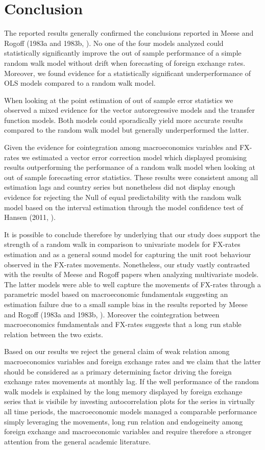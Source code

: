 \section{Conclusion}
\label{sec:conclusion}

The reported results generally confirmed the conclusions reported in Meese and Rogoff (1983a and 1983b, \cite{MeeseRogoffa, MeeseRogoffb}).
No one of the four models analyzed could statistically significantly improve the out of sample performance of a simple random walk 
model without drift when forecasting of foreign exchange rates. Moreover, we found evidence for a statistically significant underperformance of
OLS models compared to a random walk model.  

When looking at the point estimation of out of sample error statistics we observed a mixed evidence for the vector autoregressive models and the
transfer function models. Both models could sporadically yield more accurate results compared to the random walk model but generally underperformed
the latter.

Given the evidence for cointegration among macroeconomics variables and FX-rates we estimated a vector error correction model which displayed promising
results outperforming the performance of a random walk model when looking at out of sample forecasting error statistics. These results were consistent
among all estimation lags and country series but nonetheless did not display enough evidence for rejecting the Null of equal predictability with the
random walk model based on the interval estimation through the model confidence test of Hansen (2011, \cite{HansenMCS}).

It is possible to conclude therefore by underlying that our study does support the strength of a random walk in comparison to univariate models
for FX-rates estimation and as a general sound model for capturing the unit root behaviour observed in the FX-rates movements. Nonetheless, our study
vastly contrasted with the results of Meese and Rogoff papers when analyzing multivariate models. The latter models were able to well capture the
movements of FX-rates through a parametric model based on macroeconomic fundamentals suggesting an estimation failure due to a small sample bias
in the results reported by Meese and Rogoff (1983a and 1983b, \cite{MeeseRogoffa, MeeseRogoffb}). Moreover the cointegration between macroeconomics
fundamentals and FX-rates suggests that a long run stable relation between the two exists.

Based on our results we reject the general claim of weak relation among macroeconomics variables and foreign exchange rates and we claim that the
latter should be considered as a primary determining factor driving the foreign exchange rates movements at monthly lag. If the well performance of the random walk
models is explained by the long memory displayed by foreign exchange series that is visibile by investing autocorrelation plots for the series
in virtually all time periods, the macroeconomic models managed a comparable performance simply leveraging the movements, long run relation and endogeineity
among foreign exchange and macroeconomic variables and require therefore a stronger attention from the general academic literature.